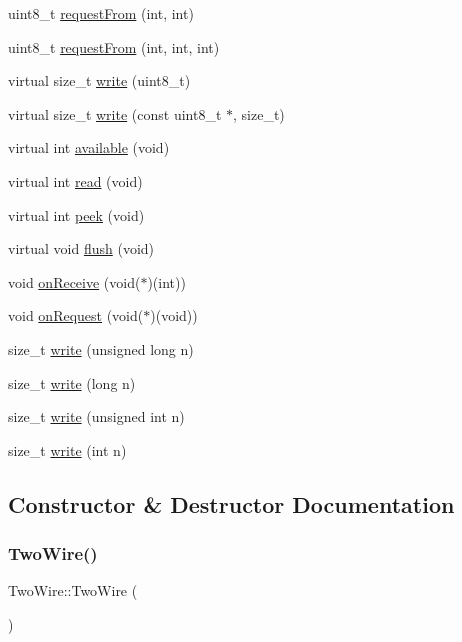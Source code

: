 \begin{DoxyCompactItemize}
\item 
uint8\+\_\+t \hyperlink{class_two_wire_ad40a27213d0bb32f7b819aa8962fccd3}{request\+From} (int, int)
\item 
uint8\+\_\+t \hyperlink{class_two_wire_a3d76da36fb8571e0b5e8310e9f86f6fe}{request\+From} (int, int, int)
\item 
virtual size\+\_\+t \hyperlink{class_two_wire_a6850a6e981a687cc57791670121664cb}{write} (uint8\+\_\+t)
\item 
virtual size\+\_\+t \hyperlink{class_two_wire_aae4d6ff65d9d4953e40ebeeccd908615}{write} (const uint8\+\_\+t $\ast$, size\+\_\+t)
\item 
virtual int \hyperlink{class_two_wire_a2fa9c43179d08d953f199fe82d0536d9}{available} (void)
\item 
virtual int \hyperlink{class_two_wire_a7769632871ef9bbe8c0850a8ff8a0b5f}{read} (void)
\item 
virtual int \hyperlink{class_two_wire_ac347efa8f804b718763fdbaae53c406d}{peek} (void)
\item 
virtual void \hyperlink{class_two_wire_ae293e7890d18eb2d47e80482033d9e77}{flush} (void)
\item 
void \hyperlink{class_two_wire_a860d97eb825c6fdca388f2f0577cc34a}{on\+Receive} (void($\ast$)(int))
\item 
void \hyperlink{class_two_wire_a224bf8799dda398fc0db223801852ca5}{on\+Request} (void($\ast$)(void))
\item 
size\+\_\+t \hyperlink{class_two_wire_a0c9d09ead8fcddf2a84781fe77d3c975}{write} (unsigned long n)
\item 
size\+\_\+t \hyperlink{class_two_wire_a55a9894186458e43852f6fb7c59bb066}{write} (long n)
\item 
size\+\_\+t \hyperlink{class_two_wire_afdb917746ee37f72e7452b4782e9527b}{write} (unsigned int n)
\item 
size\+\_\+t \hyperlink{class_two_wire_a8ec34b0d2a75e8b2751eb9f4332bd7c3}{write} (int n)
\end{DoxyCompactItemize}


\subsection{Constructor \& Destructor Documentation}
\mbox{\label{class_two_wire_a4c7daf378c06e5e72762e1bd3d5937b6}} 
\subsubsection{\texorpdfstring{Two\+Wire()}{TwoWire()}}
{\footnotesize\ttfamily Two\+Wire\+::\+Two\+Wire (\begin{DoxyParamCaption}{ }\end{DoxyParamCaption})}



